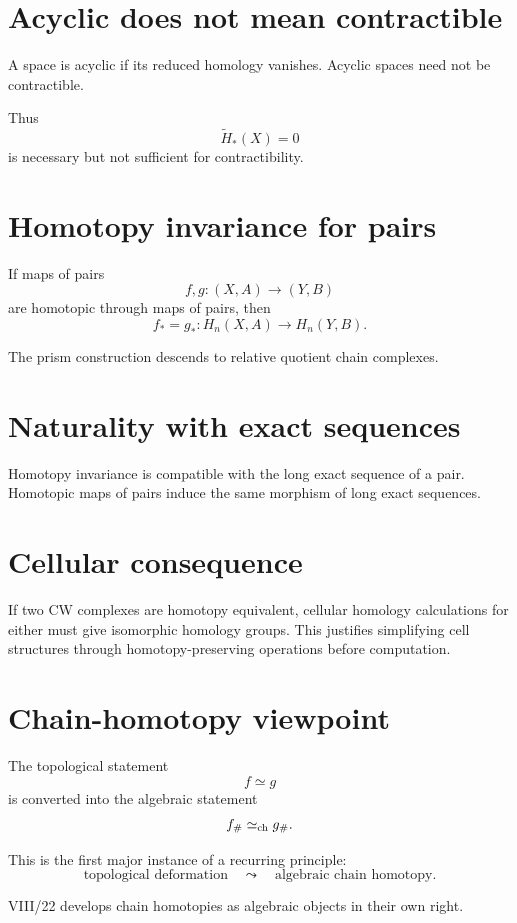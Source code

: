 \section{Acyclic does not mean contractible}

A space is acyclic if its reduced homology vanishes.  Acyclic spaces need not
be contractible.

Thus
\[
\widetilde H_*(X)=0
\]
is necessary but not sufficient for contractibility.

\section{Homotopy invariance for pairs}

If maps of pairs
\[
f,g:(X,A)\to(Y,B)
\]
are homotopic through maps of pairs, then
\[
f_*=g_*:H_n(X,A)\to H_n(Y,B).
\]

The prism construction descends to relative quotient chain complexes.

\section{Naturality with exact sequences}

Homotopy invariance is compatible with the long exact sequence of a pair.
Homotopic maps of pairs induce the same morphism of long exact sequences.

\section{Cellular consequence}

If two CW complexes are homotopy equivalent, cellular homology calculations
for either must give isomorphic homology groups.  This justifies simplifying
cell structures through homotopy-preserving operations before computation.

\section{Chain-homotopy viewpoint}

The topological statement
\[
f\simeq g
\]
is converted into the algebraic statement
\[
f_\#\simeq_{\rm ch} g_\#.
\]

This is the first major instance of a recurring principle:
\[
\text{topological deformation}
\quad\leadsto\quad
\text{algebraic chain homotopy}.
\]

VIII/22 develops chain homotopies as algebraic objects in their own right.

